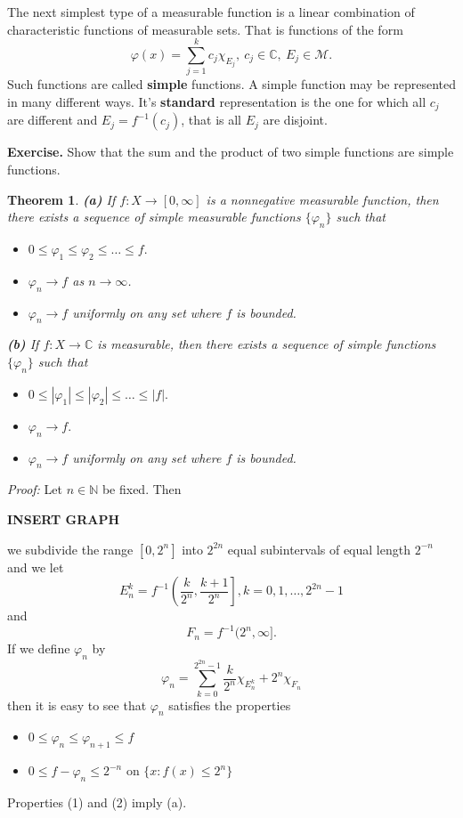 \documentclass[12pt]{report}
\newtheorem{theorem}{Theorem}[section]
\begin{document}
The next simplest type of a measurable function is a linear
combination of characteristic functions of measurable sets.  That is
functions of the form
\[
\varphi(x) = \sum^k_{j=1} c_j \chi_{E_j}, \ c_j \in \mathbb{C}, \ E_j \in
\mathcal{M}.
\] Such functions are called \textbf{simple} functions.  A simple
function may be represented in many different ways.  It's
\textbf{standard} representation is the one for which all $c_j$ are
different and $E_j = f^{-1} (c_j)$, that is all $E_j$ are disjoint.

\bigskip
\noindent
\textbf{Exercise.}  Show that the sum and the product of two simple
functions  are simple functions.


\begin{theorem}
\textbf{(a)}  If $f: X \to [0, \infty]$ is a nonnegative measurable
function, then there exists a sequence of simple measurable functions
$\{\varphi_n\}$ such that
\begin{itemize}
\item[(i)]  $0 \le \varphi_1 \le \varphi_2 \le \dots \le f.$
\item[(ii)]  $\varphi_n \longrightarrow f$ \textit{as} $n \to \infty$.
\item[(iii)]  $\varphi_n \longrightarrow f$ uniformly on any set
where $f$ is bounded.
\end{itemize}
\noindent
\textbf{(b)}  If $f: X \longrightarrow \mathbb{C}$ is measurable,
then there exists a sequence of simple functions $\{\varphi_n\}$ such
that
\begin{itemize}
\item[(i)] $0 \le |\varphi_1| \le |\varphi_2| \le \dots \le |f| .$
\item[(ii)]  $\varphi_n \longrightarrow f.$
\item[(iii)]  $\varphi_n \longrightarrow f$ uniformly on any set
where $f$ is bounded.
\end{itemize}
\end{theorem}
\textit{Proof:}  
Let $n \in \mathbb{N}$ be fixed.  Then

\smallskip
\noindent
\centerline{\textbf{INSERT GRAPH}}
\smallskip
\noindent we subdivide the range $[0, 2^n]$ into $2^{2n}$ equal
subintervals of equal length
$2^{-n}$ and we let
\[ E^k_n = f^{-1} \left ( \frac{k}{2^n}, \frac{k+1}{2^n} \right ], k = 0, 1,
\dots, 2^{2n} -1
\] and
\[ F_n = f^{-1} (2^n, \infty].
\] If we define $\varphi_n$ by 
\[
\varphi_n = \sum_{k=0}^{2^{2n} -1} \frac{k}{2^n} \chi_{E^k_n}+ 2^n
\chi_{F_n}
\] then it is easy to see that $\varphi_n$ satisfies the properties
\begin{itemize}
\item[(1)]  $0 \le \varphi_n \le \varphi_{n+1} \le f$
\item[(2)] $0 \le f - \varphi_n \le 2^{-n} \mbox{ on } \{x: f(x) \le 2^n\}$
\end{itemize} Properties (1) and (2) imply (a).
\end{document}
